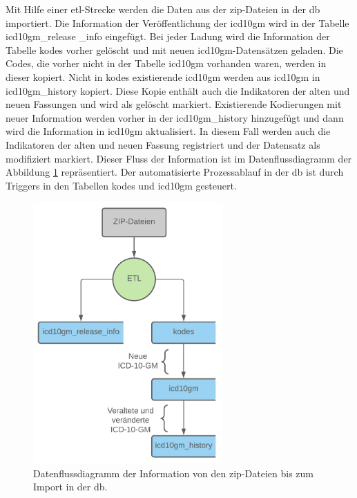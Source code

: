Mit Hilfe einer \ac{etl}-Strecke werden die Daten aus der \ac{zip}-Dateien in der \ac{db} importiert. Die Information der Veröffentlichung der \ac{icd10gm} wird in der Tabelle \textsf{icd10gm\_release \_info} eingefügt. Bei jeder Ladung wird die Information der Tabelle \textsf{kodes} vorher gelöscht und mit neuen \ac{icd10gm}-Datensätzen geladen. Die Codes, die vorher nicht in der Tabelle \textsf{icd10gm} vorhanden waren, werden in dieser kopiert. Nicht in \textsf{kodes} existierende \ac{icd10gm} werden aus \textsf{icd10gm} in \textsf{icd10gm\_history} kopiert. Diese Kopie enthält auch die Indikatoren der alten und neuen Fassungen und wird als gelöscht markiert. Existierende Kodierungen mit neuer Information werden vorher in der \textsf{icd10gm\_history} hinzugefügt und dann wird die Information in \textsf{icd10gm} aktualisiert. In diesem Fall werden auch die Indikatoren der alten und neuen Fassung registriert und der Datensatz als modifiziert markiert. Dieser Fluss der Information ist im Datenflussdiagramm der Abbildung \ref{fig:dbflow} repräsentiert. Der automatisierte Prozessablauf in der \ac{db} ist durch Triggers in den Tabellen \textsf{kodes} und \textsf{icd10gm} gesteuert.

\begin{figure}[ht]
	\centering
	\includegraphics[height=10cm]{figures/dbflow}
	\caption[Datenfluss des Prozesses]{Datenflussdiagramm der Information von den \ac{zip}-Dateien bis zum Import in der \ac{db}.}
	\label{fig:dbflow}
\end{figure} 